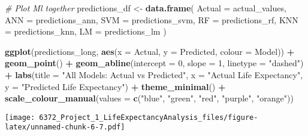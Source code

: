 \documentclass[
]{article}
\newenvironment{Shaded}{\begin{snugshade}}{\end{snugshade}}
\newcommand{\AttributeTok}[1]{\textcolor[rgb]{0.13,0.29,0.53}{#1}}
\newcommand{\CommentTok}[1]{\textcolor[rgb]{0.56,0.35,0.01}{\textit{#1}}}
\newcommand{\DecValTok}[1]{\textcolor[rgb]{0.00,0.00,0.81}{#1}}
\newcommand{\FunctionTok}[1]{\textcolor[rgb]{0.13,0.29,0.53}{\textbf{#1}}}
\newcommand{\NormalTok}[1]{#1}
\newcommand{\OtherTok}[1]{\textcolor[rgb]{0.56,0.35,0.01}{#1}}
\newcommand{\SpecialCharTok}[1]{\textcolor[rgb]{0.81,0.36,0.00}{\textbf{#1}}}
\newcommand{\StringTok}[1]{\textcolor[rgb]{0.31,0.60,0.02}{#1}}
\begin{document}
\begin{Shaded}
\begin{Highlighting}[]
\CommentTok{\# Plot Ml together}
\NormalTok{predictions\_df }\OtherTok{\textless{}{-}} \FunctionTok{data.frame}\NormalTok{(}
  \AttributeTok{Actual =}\NormalTok{ actual\_values,}
  \AttributeTok{ANN =}\NormalTok{ predictions\_ann,}
  \AttributeTok{SVM =}\NormalTok{ predictions\_svm,}
  \AttributeTok{RF =}\NormalTok{ predictions\_rf,}
  \AttributeTok{KNN =}\NormalTok{ predictions\_knn,}
  \AttributeTok{LM =}\NormalTok{ predictions\_lm}
\NormalTok{)}

\FunctionTok{ggplot}\NormalTok{(predictions\_long, }\FunctionTok{aes}\NormalTok{(}\AttributeTok{x =}\NormalTok{ Actual, }\AttributeTok{y =}\NormalTok{ Predicted, }\AttributeTok{colour =}\NormalTok{ Model)) }\SpecialCharTok{+}
  \FunctionTok{geom\_point}\NormalTok{() }\SpecialCharTok{+}
  \FunctionTok{geom\_abline}\NormalTok{(}\AttributeTok{intercept =} \DecValTok{0}\NormalTok{, }\AttributeTok{slope =} \DecValTok{1}\NormalTok{, }\AttributeTok{linetype =} \StringTok{"dashed"}\NormalTok{) }\SpecialCharTok{+}
  \FunctionTok{labs}\NormalTok{(}\AttributeTok{title =} \StringTok{"All Models: Actual vs Predicted"}\NormalTok{, }\AttributeTok{x =} \StringTok{"Actual Life Expectancy"}\NormalTok{, }\AttributeTok{y =} \StringTok{"Predicted Life Expectancy"}\NormalTok{) }\SpecialCharTok{+}
  \FunctionTok{theme\_minimal}\NormalTok{() }\SpecialCharTok{+}
  \FunctionTok{scale\_colour\_manual}\NormalTok{(}\AttributeTok{values =} \FunctionTok{c}\NormalTok{(}\StringTok{"blue"}\NormalTok{, }\StringTok{"green"}\NormalTok{, }\StringTok{"red"}\NormalTok{, }\StringTok{"purple"}\NormalTok{, }\StringTok{"orange"}\NormalTok{))}
\end{Highlighting}
\end{Shaded}

\texttt{[image: 6372\_Project\_1\_LifeExpectancyAnalysis\_files/figure-latex/unnamed-chunk-6-7.pdf]}
\end{document}
